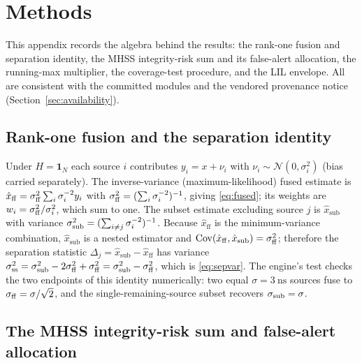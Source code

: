 \section{Methods}
\label{app:methods}

This appendix records the algebra behind the results: the rank-one fusion and
separation identity, the MHSS integrity-risk sum and its false-alert allocation,
the running-max multiplier, the coverage-test procedure, and the LIL envelope. All
are consistent with the committed modules and the vendored provenance notice
(Section~\ref{sec:availability}).

\subsection{Rank-one fusion and the separation identity}
\label{app:algebra}

Under $H=\bm 1_N$ each source $i$ contributes $y_i=x+\nu_i$ with
$\nu_i\sim\mathcal N(0,\sigma_i^2)$ (bias carried separately). The
inverse-variance (maximum-likelihood) fused estimate is
$\hat x_{\mathrm{ff}}=\sigma_{\mathrm{ff}}^{2}\sum_i \sigma_i^{-2}y_i$ with
$\sigma_{\mathrm{ff}}^{2}=(\sum_i\sigma_i^{-2})^{-1}$, giving \eqref{eq:fused}; its
weights are $w_i=\sigma_{\mathrm{ff}}^{2}/\sigma_i^{2}$, which sum to one. The subset estimate
excluding source $j$ is $\hat x_{\mathrm{sub}}$ with variance
$\sigma_{\mathrm{sub}}^{2}=(\sum_{i\neq j}\sigma_i^{-2})^{-1}$. Because $\hat x_{\mathrm{ff}}$ is
the minimum-variance combination, $\hat x_{\mathrm{sub}}$ is a nested estimator and
$\operatorname{Cov}(\hat x_{\mathrm{ff}},\hat x_{\mathrm{sub}})=\sigma_{\mathrm{ff}}^{2}$;
therefore the separation statistic $\Delta_j=\hat x_{\mathrm{sub}}-\hat
x_{\mathrm{ff}}$ has variance
$\sigma_{\mathrm{ss}}^{2}=\sigma_{\mathrm{sub}}^{2}-2\sigma_{\mathrm{ff}}^{2}+\sigma_{\mathrm{ff}}^{2}=\sigma_{\mathrm{sub}}^{2}-\sigma_{\mathrm{ff}}^{2}$, which is
\eqref{eq:sepvar}. The engine's 
test checks the two endpoints of this identity numerically: two equal
$\sigma=\SI{3}{\nano\second}$ sources fuse to $\sigma_{\mathrm{ff}}=\sigma/\sqrt2$, and the
single-remaining-source subset recovers $\sigma_{\mathrm{sub}}=\sigma$.

\subsection{The MHSS integrity-risk sum and false-alert allocation}
\label{app:mhss}

